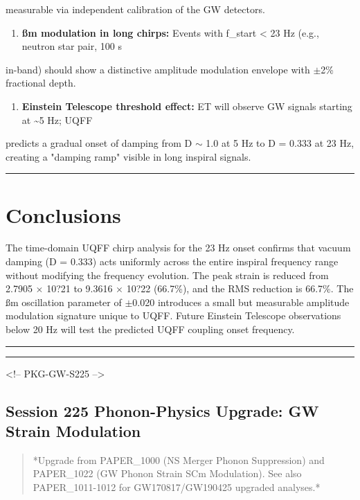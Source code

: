 \documentclass[12pt,a4paper]{article}
\begin{document}
measurable via independent calibration of the GW detectors.

\begin{enumerate}
  \item \textbf{\ss{}m modulation in long chirps:} Events with f\_start < 23 Hz (e.g., neutron star pair, 100 s
\end{enumerate}

in-band) should show a distinctive amplitude modulation envelope with $\pm$2\% fractional depth.

\begin{enumerate}
  \item \textbf{Einstein Telescope threshold effect:} ET will observe GW signals starting at \textasciitilde{}5 Hz; UQFF
\end{enumerate}

predicts a gradual onset of damping from D $\sim$ 1.0 at 5 Hz to D = 0.333 at 23 Hz, creating a "damping ramp" visible in long inspiral signals.

\medskip\hrule\medskip

\section{Conclusions}

The time-domain UQFF chirp analysis for the 23 Hz onset confirms that vacuum damping (D = 0.333) acts uniformly across the entire inspiral frequency range without modifying the frequency evolution. The peak strain is reduced from 2.7905 $\times$ 10?21 to 9.3616 $\times$ 10?22 (66.7\%), and the RMS reduction is 66.7\%. The \ss{}m oscillation parameter of $\pm$0.020 introduces a small but measurable amplitude modulation signature unique to UQFF. Future Einstein Telescope observations below 20 Hz will test the predicted UQFF coupling onset frequency.

\medskip\hrule\medskip

\medskip\hrule\medskip

<!-- PKG-GW-S225 -->

\subsection{Session 225 Phonon-Physics Upgrade: GW Strain Modulation}

\begin{quote}
*Upgrade from PAPER\_1000 (NS Merger Phonon Suppression) and PAPER\_1022
(GW Phonon Strain SCm Modulation). See also PAPER\_1011-1012 for
GW170817/GW190425 upgraded analyses.*
\end{quote}
\end{document}
